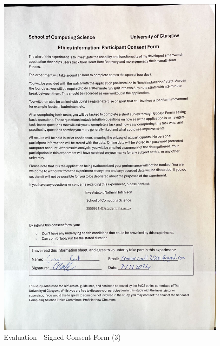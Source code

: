\documentclass{l4proj}
\begin{document}
\begin{figure}[h!]
    \centering
    \includegraphics[width=1\linewidth]{dissertation//dissImages/Consent3.jpg}
    \caption{Evaluation - Signed Consent Form (3)}
\end{figure}
\end{document}

